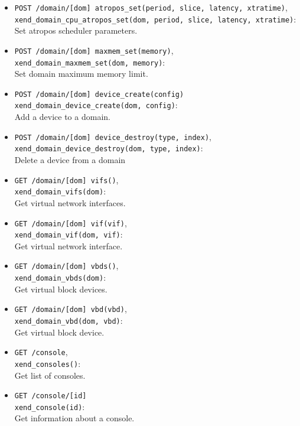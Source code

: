 \documentclass[11pt,twoside,final,openright]{xenstyle}
\begin{document}
\begin{itemize}
\item {\tt POST /domain/[dom] atropos\_set(period, slice, latency, xtratime)},\\
  {\tt xend\_domain\_cpu\_atropos\_set(dom, period, slice, latency, xtratime)}:\\
  Set atropos scheduler parameters.

\item {\tt POST /domain/[dom] maxmem\_set(memory)},\\
  {\tt xend\_domain\_maxmem\_set(dom, memory)}:\\
  Set domain maximum memory limit.

\item {\tt POST /domain/[dom] device\_create(config)}\\
  {\tt xend\_domain\_device\_create(dom, config)}:\\
  Add a device to a domain.

\item {\tt POST /domain/[dom] device\_destroy(type, index)},\\
  {\tt xend\_domain\_device\_destroy(dom, type, index)}:\\
  Delete a device from a domain

\item {\tt GET /domain/[dom] vifs()},\\
  {\tt xend\_domain\_vifs(dom)}:\\
  Get virtual network interfaces.

\item {\tt GET /domain/[dom] vif(vif)},\\
  {\tt xend\_domain\_vif(dom, vif)}:\\
  Get virtual network interface.

\item {\tt GET /domain/[dom] vbds()},\\
  {\tt xend\_domain\_vbds(dom)}:\\
  Get virtual block devices.

\item {\tt GET /domain/[dom] vbd(vbd)},\\
  {\tt xend\_domain\_vbd(dom, vbd)}:\\
  Get virtual block device.

\item {\tt GET /console},\\
  {\tt xend\_consoles()}:\\
  Get list of consoles.

\item {\tt GET /console/[id]}\\
  {\tt xend\_console(id)}:\\
  Get information about a console.


\end{itemize}
\end{document}
